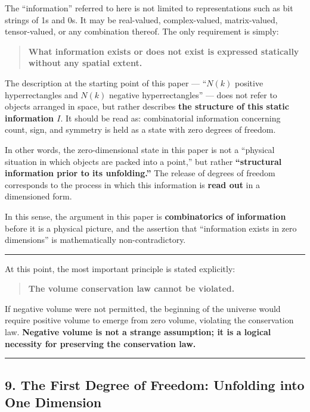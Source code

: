 \documentclass[a4paper,11pt]{article}
\theoremstyle{definition}
\begin{document}
The ``information'' referred to here is not limited to representations
such as bit strings of 1s and 0s. It may be real-valued, complex-valued,
matrix-valued, tensor-valued, or any combination thereof. The only
requirement is simply:

\begin{quote}
\textbf{What information exists or does not exist is expressed
statically without any spatial extent.}
\end{quote}

The description at the starting point of this paper --- ``\(N(k)\)
positive hyperrectangles and \(N(k)\) negative hyperrectangles'' ---
does not refer to objects arranged in space, but rather describes
\textbf{the structure of this static information \(I\)}. It should be
read as: combinatorial information concerning count, sign, and symmetry
is held as a state with zero degrees of freedom.

In other words, the zero-dimensional state in this paper is not a
``physical situation in which objects are packed into a point,'' but
rather \textbf{``structural information prior to its unfolding.''} The
release of degrees of freedom corresponds to the process in which this
information is \textbf{read out} in a dimensioned form.

In this sense, the argument in this paper is \textbf{combinatorics of
information} before it is a physical picture, and the assertion that
``information exists in zero dimensions'' is mathematically
non-contradictory.

\begin{center}\rule{0.5\linewidth}{0.5pt}\end{center}

At this point, the most important principle is stated explicitly:

\begin{quote}
\textbf{The volume conservation law cannot be violated.}
\end{quote}

If negative volume were not permitted, the beginning of the universe
would require positive volume to emerge from zero volume, violating the
conservation law. \textbf{Negative volume is not a strange assumption;
it is a logical necessity for preserving the conservation law.}

\begin{center}\rule{0.5\linewidth}{0.5pt}\end{center}

\subsection{9. The First Degree of Freedom: Unfolding into One
Dimension}\label{the-first-degree-of-freedom-unfolding-into-one-dimension}
\end{document}
